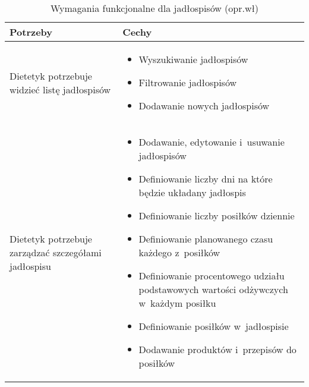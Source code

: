 \begin{minipage}{\textwidth}
    \begin{table}[H]
        \centering\caption{Wymagania funkcjonalne dla jadłospisów (opr.wł)\label{tabela:wymaganiaFunkcjonalneJadlospisy}}
        \begin{tabular}{|P{.3\textwidth}|P{.6\textwidth}|}
            \hline
            Potrzeby & Cechy \\

            \hline
            Dietetyk potrzebuje widzieć listę jadłospisów &
            \begin{itemize}
                \item Wyszukiwanie jadłospisów
                \item Filtrowanie jadłospisów
                \item Dodawanie nowych jadłospisów
            \end{itemize} \\
            \hline
            Dietetyk potrzebuje zarządzać szczegółami jadłospisu &
            \begin{itemize}
                \item Dodawanie, edytowanie i~usuwanie jadłospisów
                \item Definiowanie liczby dni na które będzie układany jadłospis
                \item Definiowanie liczby posiłków dziennie
                \item Definiowanie planowanego czasu każdego z~posiłków
                \item Definiowanie procentowego udziału podstawowych wartości odżywczych w~każdym posiłku
                \item Definiowanie posiłków w~jadłospisie
                \item Dodawanie produktów i~przepisów do posiłków
            \end{itemize} \\
            \hline
        \end{tabular}
    \end{table}
\end{minipage}

